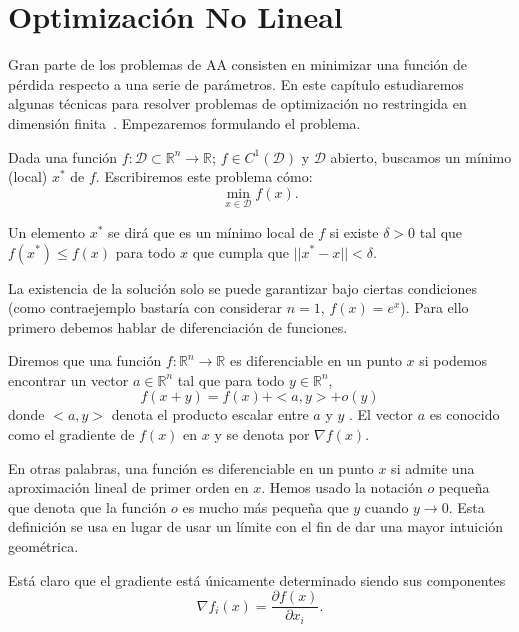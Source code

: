 \chapter{Optimización No Lineal}\label{sec:optim}
Gran parte de los problemas de \ac{AA} consisten en minimizar una función de pérdida respecto a una serie de parámetros. En este capítulo estudiaremos algunas técnicas para resolver problemas de optimización no restringida en dimensión finita~\cite{Luenberger-1969, Spelluci-1993, polyak-1987}. Empezaremos formulando el problema. 

Dada una función $f: \mathcal{D} \subset \mathbb{R}^n \to \mathbb{R}$; $f \in C^1(\mathcal{D})$ y $\mathcal{D}$ abierto, buscamos un mínimo (local) $x^*$ de $f$. Escribiremos este problema cómo:
\begin{equation}\label{minization}
    \min_{x \in \mathcal{D}}f(x).
\end{equation}
\begin{definition}
    Un elemento $x^*$ se dirá que es un mínimo local de $f$ si existe $\delta > 0$ tal que $f(x^*) \le f(x)$ para todo $x$ que cumpla que $||x^* - x||< \delta$.
\end{definition}

La existencia de la solución solo se puede garantizar bajo ciertas condiciones (como contraejemplo bastaría con considerar $n=1$, $f(x)=e^{x}$). Para ello primero debemos hablar de diferenciación de funciones. 
\begin{definition}
    Diremos que una función $f: \mathbb{R}^n \to \mathbb{R}$ es diferenciable en un punto $x$ si podemos encontrar un vector $a \in \mathbb{R}^n$ tal que para todo $y \in \mathbb{R}^n$,
    \begin{equation}
         f(x + y) = f(x) + <a, y> + o(y) 
    \end{equation}
    donde $<a,y>$ denota el producto escalar entre $a$ y $y$ . El vector $a$ es conocido como el gradiente de $f(x)$ en $x$ y se denota por $\nabla f(x)$.
\end{definition}
En otras palabras, una función es diferenciable en un punto $x$ si admite una aproximación lineal de primer orden en $x$. Hemos usado la notación $o$ pequeña que denota que la función $o$ es mucho más pequeña que $y$ cuando $y \to 0$. Esta definición se usa en lugar de usar un límite con el fin de dar una mayor intuición geométrica.

Está claro que el gradiente está únicamente determinado siendo sus componentes
\begin{equation}
     \nabla f_i(x) = \frac{\partial f(x)}{\partial x_i}.
\end{equation}

